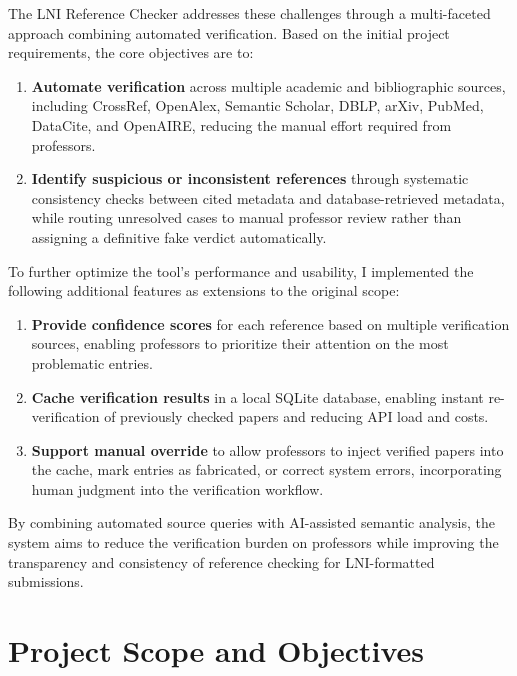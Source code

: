 \documentclass[12pt,a4paper,oneside]{report}
\begin{document}
The LNI Reference Checker addresses these challenges through a multi-faceted approach combining automated verification. Based on the initial project requirements, the core objectives are to:

\begin{enumerate}
    \item \textbf{Automate verification} across multiple academic and bibliographic sources, including CrossRef, OpenAlex, Semantic Scholar, DBLP, arXiv, PubMed, DataCite, and OpenAIRE, reducing the manual effort required from professors.
    
    \item \textbf{Identify suspicious or inconsistent references} through systematic consistency checks between cited metadata and database-retrieved metadata, while routing unresolved cases to manual professor review rather than assigning a definitive fake verdict automatically.
\end{enumerate}

To further optimize the tool's performance and usability, I implemented the following additional features as extensions to the original scope:

\begin{enumerate}
    \item \textbf{Provide confidence scores} for each reference based on multiple verification sources, enabling professors to prioritize their attention on the most problematic entries.
    
    \item \textbf{Cache verification results} in a local SQLite database, enabling instant re-verification of previously checked papers and reducing API load and costs.
    
    \item \textbf{Support manual override} to allow professors to inject verified papers into the cache, mark entries as fabricated, or correct system errors, incorporating human judgment into the verification workflow.
    
\end{enumerate}
By combining automated source queries with AI-assisted semantic analysis, the system aims to reduce the verification burden on professors while improving the transparency and consistency of reference checking for LNI-formatted submissions.

\section{Project Scope and Objectives}
\end{document}
